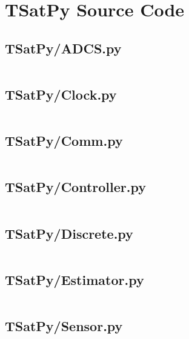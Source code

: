
\chapter{TSatPy Source Code}
\label{chap:tsatpy_source}

\linespread{1}

\pagebreak
\section{TSatPy/ADCS.py}\label{code:TSatPy/ADCS.py}\inputminted[linenos,fontsize=\scriptsize]{python}{/home/dcouture/git/mathyourlife/TSatPy/TSatPy/ADCS.py}

\pagebreak
\section{TSatPy/Clock.py}\label{code:TSatPy/Clock.py}\inputminted[linenos,fontsize=\scriptsize]{python}{/home/dcouture/git/mathyourlife/TSatPy/TSatPy/Clock.py}

\pagebreak
\section{TSatPy/Comm.py}\label{code:TSatPy/Comm.py}\inputminted[linenos,fontsize=\scriptsize]{python}{/home/dcouture/git/mathyourlife/TSatPy/TSatPy/Comm.py}

\pagebreak
\section{TSatPy/Controller.py}\label{code:TSatPy/Controller.py}\inputminted[linenos,fontsize=\scriptsize]{python}{/home/dcouture/git/mathyourlife/TSatPy/TSatPy/Controller.py}

\pagebreak
\section{TSatPy/Discrete.py}\label{code:TSatPy/Discrete.py}\inputminted[linenos,fontsize=\scriptsize]{python}{/home/dcouture/git/mathyourlife/TSatPy/TSatPy/Discrete.py}

\pagebreak
\section{TSatPy/Estimator.py}\label{code:TSatPy/Estimator.py}\inputminted[linenos,fontsize=\scriptsize]{python}{/home/dcouture/git/mathyourlife/TSatPy/TSatPy/Estimator.py}

\pagebreak
\section{TSatPy/Sensor.py}\label{code:TSatPy/Sensor.py}\inputminted[linenos,fontsize=\scriptsize]{python}{/home/dcouture/git/mathyourlife/TSatPy/TSatPy/Sensor.py}

